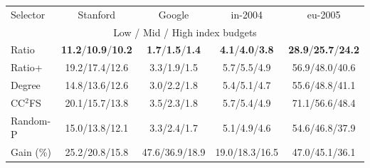 \begin{tabular}{@{}lcccc@{}}
\toprule
Selector & Stanford & Google & in-2004 & eu-2005 \\
\multicolumn{5}{c}{Low / Mid / High index budgets} \\
\midrule
\rowcolor{exptint}Ratio & \textbf{11.2}/\textbf{10.9}/\textbf{10.2} & \textbf{1.7}/\textbf{1.5}/\textbf{1.4} & \textbf{4.1}/\textbf{4.0}/\textbf{3.8} & \textbf{28.9}/\textbf{25.7}/\textbf{24.2} \\
Ratio+ & 19.2/17.4/12.6 & 3.3/1.9/1.5 & 5.7/5.5/4.9 & 56.9/48.0/40.6 \\
Degree & 14.8/13.6/12.6 & 3.0/2.2/1.8 & 5.4/5.1/4.7 & 55.6/48.8/41.1 \\
CC$^2$FS & 20.1/15.7/13.8 & 3.5/2.3/1.8 & 5.7/5.4/4.9 & 71.1/56.6/48.4 \\
Random-P & 15.0/13.8/12.1 & 3.3/2.4/1.7 & 5.1/4.9/4.6 & 54.6/46.8/37.9 \\
\midrule
Gain (\%) & 25.2/20.8/15.8 & 47.6/36.9/18.9 & 19.0/18.3/16.5 & 47.0/45.1/36.1 \\
\bottomrule
\end{tabular}
